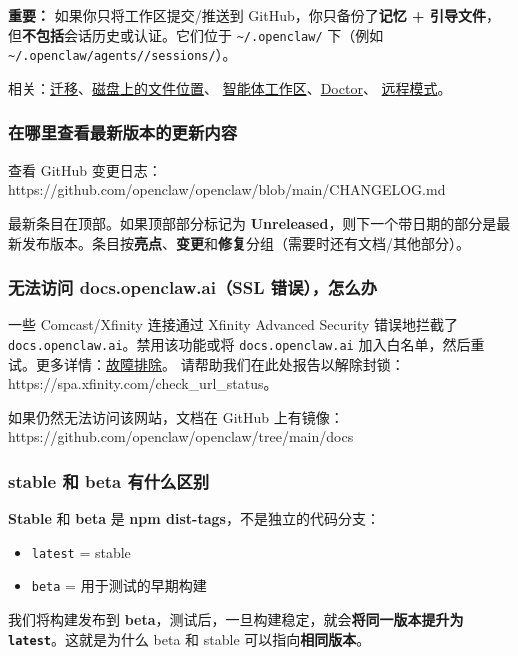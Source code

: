 \textbf{重要：} 如果你只将工作区提交/推送到 GitHub，你只备份了\textbf{记忆 + 引导文件}，但\textbf{不包括}会话历史或认证。它们位于 \texttt{\textasciitilde{}/.openclaw/} 下（例如 \texttt{\textasciitilde{}/.openclaw/agents//sessions/}）。

相关：\href{/install/migrating}{迁移}、\href{/help/faq\#where-does-openclaw-store-its-data}{磁盘上的文件位置}、
\href{/concepts/agent-workspace}{智能体工作区}、\href{/gateway/doctor}{Doctor}、
\href{/gateway/remote}{远程模式}。

\subsubsection{在哪里查看最新版本的更新内容}


查看 GitHub 变更日志：
https://github.com/openclaw/openclaw/blob/main/CHANGELOG.md

最新条目在顶部。如果顶部部分标记为 \textbf{Unreleased}，则下一个带日期的部分是最新发布版本。条目按\textbf{亮点}、\textbf{变更}和\textbf{修复}分组（需要时还有文档/其他部分）。

\subsubsection{无法访问 docs.openclaw.ai（SSL 错误），怎么办}


一些 Comcast/Xfinity 连接通过 Xfinity Advanced Security 错误地拦截了 \texttt{docs.openclaw.ai}。禁用该功能或将 \texttt{docs.openclaw.ai} 加入白名单，然后重试。更多详情：\href{/help/troubleshooting\#docsopenclawai-shows-an-ssl-error-comcastxfinity}{故障排除}。
请帮助我们在此处报告以解除封锁：https://spa.xfinity.com/check\_url\_status。

如果仍然无法访问该网站，文档在 GitHub 上有镜像：
https://github.com/openclaw/openclaw/tree/main/docs

\subsubsection{stable 和 beta 有什么区别}


\textbf{Stable} 和 \textbf{beta} 是 \textbf{npm dist-tags}，不是独立的代码分支：

\begin{itemize}
  \item \texttt{latest} = stable
  \item \texttt{beta} = 用于测试的早期构建
\end{itemize}


我们将构建发布到 \textbf{beta}，测试后，一旦构建稳定，就会\textbf{将同一版本提升为 \texttt{latest}}。这就是为什么 beta 和 stable 可以指向\textbf{相同版本}。

